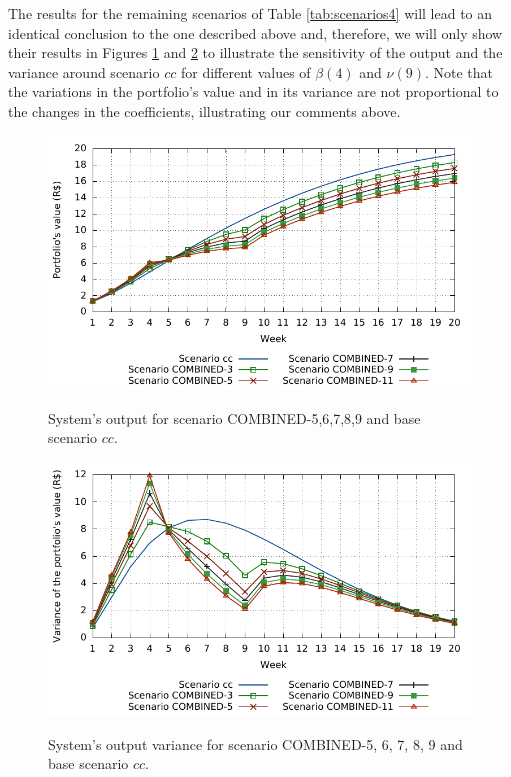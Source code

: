 The results for the remaining scenarios of Table \ref{tab:scenarios4} will lead to an identical conclusion to the one described above and, therefore, we will only show their results in Figures \ref{fig:y_spec56789} and \ref{fig:var_spec56789} to illustrate the sensitivity of the output and the variance around scenario $cc$ for different values of $\beta(4)$ and $\nu(9)$.
%
Note that the variations in the portfolio's value and in its variance are not proportional to the changes in the coefficients, illustrating our comments above.
%
\begin{figure} [H]
	\caption{System's output for scenario COMBINED-5,6,7,8,9 and base scenario $cc$.}
	\centering
	\includegraphics[width=6in,keepaspectratio]{figures/y_spec56789}
	\label{fig:y_spec56789}
\end{figure}
%
\begin{figure} [H]
	\caption{System's output variance for scenario COMBINED-5, 6, 7, 8, 9 and base scenario $cc$.}
	\centering
	\includegraphics[width=6in,keepaspectratio]{figures/var_spec56789}
	\label{fig:var_spec56789}
\end{figure}
\vfill


